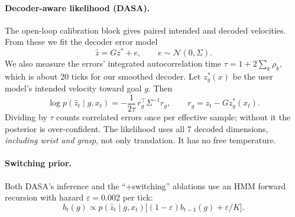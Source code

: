 \paragraph{Decoder-aware likelihood (DASA).} The open-loop calibration block gives
paired intended and decoded velocities. From these we fit the decoder error model
\begin{equation}
\hat z=G z^*+e,\qquad e\sim\mathcal N(0,\Sigma).
\end{equation}
We also measure the errors' integrated autocorrelation time
$\tau=1+2\sum_k\rho_k$, which is about 20 ticks for our smoothed decoder. Let
$z^*_g(x)$ be the user model's intended velocity toward goal $g$. Then
\begin{equation}
\log p(\hat z_t\mid g,x_t)=-\frac{1}{2\tau}\,r_g^\top\Sigma^{-1}r_g,\qquad r_g=\hat z_t-Gz^*_g(x_t).
\end{equation}
Dividing by $\tau$ counts correlated errors once per effective sample; without it the
posterior is over-confident. The likelihood uses all 7 decoded dimensions,
\emph{including wrist and grasp}, not only translation. It has no free temperature.

\paragraph{Switching prior.} Both DASA's inference and the ``+switching'' ablations use
an HMM forward recursion with hazard $\varepsilon=0.002$ per tick:
\begin{equation}
b_t(g)\propto p(\hat z_t\mid g,x_t)\big[(1-\varepsilon)b_{t-1}(g)+\varepsilon/K\big].
\end{equation}

